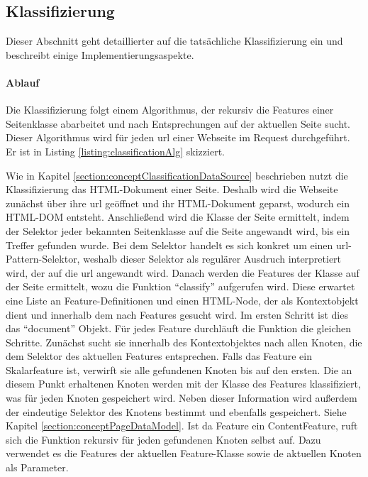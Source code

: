 \subsection{Klassifizierung}
    Dieser Abschnitt geht detaillierter auf die tatsächliche Klassifizierung ein
    und beschreibt einige Implementierungsaspekte.

    \paragraph{Ablauf}
    Die Klassifizierung folgt einem Algorithmus,
    der rekursiv die Features einer Seitenklasse abarbeitet und nach Entsprechungen
    auf der aktuellen Seite sucht.
    Dieser Algorithmus wird für jeden \gls{url} einer Webseite im  Request durchgeführt.
    Er ist in Listing \ref{listing:classificationAlg} skizziert.

    

    Wie in Kapitel \ref{section:conceptClassificationDataSource} beschrieben
    nutzt die Klassifizierung das HTML-Dokument einer Seite.
    Deshalb wird die Webseite zunächst über ihre \gls{url} geöffnet und ihr HTML-Dokument geparst,
    wodurch ein HTML-DOM entsteht.%
    Anschließend wird die Klasse der Seite ermittelt, indem der Selektor jeder bekannten
    Seitenklasse auf die Seite angewandt wird, bis ein Treffer gefunden wurde.
    Bei dem Selektor handelt es sich konkret um einen \gls{url}-Pattern-Selektor,
    weshalb dieser Selektor als regulärer Ausdruch interpretiert wird,
    der auf die \gls{url} angewandt wird.
    Danach werden die Features der Klasse auf der Seite ermittelt,
    wozu die Funktion "`classify"' aufgerufen wird.
    Diese erwartet eine Liste an Feature-Definitionen und einen HTML-Node,
    der als Kontextobjekt dient und innerhalb dem nach Features gesucht wird.
    Im ersten Schritt ist dies das "`document"' Objekt. %
    Für jedes Feature durchläuft die Funktion die gleichen Schritte.
    Zunächst sucht sie innerhalb des Kontextobjektes nach allen Knoten,
    die dem Selektor des aktuellen Features entsprechen.
    Falls das Feature ein Skalarfeature ist, verwirft sie alle gefundenen Knoten bis auf den ersten.
    Die an diesem Punkt erhaltenen Knoten werden mit der Klasse des Features klassifiziert,
    was für jeden Knoten gespeichert wird.
    Neben dieser Information wird außerdem der eindeutige Selektor des Knotens bestimmt und ebenfalls gespeichert.
    Siehe Kapitel \ref{section:conceptPageDataModel}.
    Ist da Feature ein ContentFeature, ruft sich die Funktion rekursiv für jeden gefundenen Knoten selbst auf.
    Dazu verwendet es die Features der aktuellen Feature-Klasse sowie de aktuellen Knoten als Parameter.

